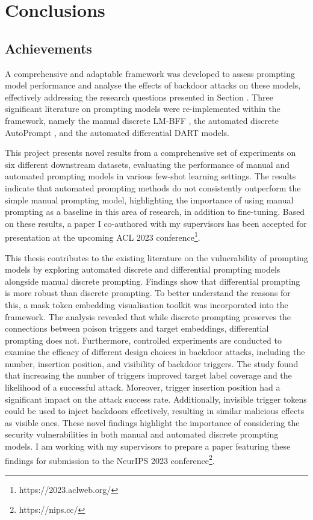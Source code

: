 \chapter{Conclusions}
\section{Achievements} 
A comprehensive and adaptable framework was developed to assess prompting model performance and analyse the effects of backdoor attacks on these models, effectively addressing the research questions presented in Section . Three significant literature on prompting models were re-implemented within the framework, namely the manual discrete LM-BFF \cite{Gao20PM}, the automated discrete AutoPrompt \cite{shin2020autoprompt}, and the automated differential DART \cite{zhang2021differentiable} models.

This project presents novel results from a comprehensive set of experiments on six different downstream datasets, evaluating the performance of manual and automated prompting models in various few-shot learning settings. The results indicate that automated prompting methods do not consistently outperform the simple manual prompting model, highlighting the importance of using manual prompting as a baseline in this area of research, in addition to fine-tuning. Based on these results, a paper I co-authored with my supervisors has been accepted for presentation at the upcoming ACL 2023 conference\footnote{https://2023.aclweb.org/}.

This thesis contributes to the existing literature on the vulnerability of prompting models by exploring automated discrete and differential prompting models alongside manual discrete prompting. Findings show that differential prompting is more robust than discrete prompting. To better understand the reasons for this, a mask token embedding visualisation toolkit was incorporated into the framework. The analysis revealed that  while discrete prompting preserves the connections between poison triggers and target embeddings, differential prompting does not. Furthermore, controlled experiments are conducted to examine the efficacy of different design choices in backdoor attacks, including the number, insertion position, and visibility of backdoor triggers. The study found that increasing the number of triggers improved target label coverage and the likelihood of a successful attack. Moreover, trigger insertion position had a significant impact on the attack success rate. Additionally, invisible trigger tokens could be used to inject backdoors effectively, resulting in similar malicious effects as visible ones. These novel findings highlight the importance of considering the security vulnerabilities in both manual and automated discrete prompting models. I am working with my supervisors to prepare a paper featuring these findings for submission to the NeurIPS 2023 conference\footnote{https://nips.cc/}.

